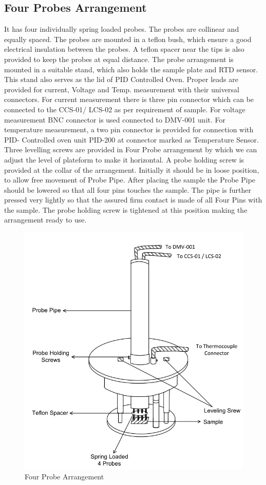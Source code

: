 \documentclass[%
 aip,
 amsmath,amssymb,
 reprint,%
]{revtex4-1}
\begin{document}
\subsection{Four Probes Arrangement}
It has four individually spring loaded probes. The probes are collinear and
equally spaced. The probes are mounted in a teflon bush, which ensure a good
electrical insulation between the probes. A teflon spacer near the tips is also provided
to keep the probes at equal distance. The probe arrangement is mounted in a suitable
stand, which also holds the sample plate and RTD sensor. This stand also serves as
the lid of PID Controlled Oven. Proper leads are provided for current, Voltage and
Temp. measurement with their universal connectors. For current measurement there is
three pin connector which can be connected to the CCS-01/ LCS-02 as per
requirement of sample. For voltage measurement BNC connector is used connected to
DMV-001 unit. For temperature measurement, a two pin connector is provided for
connection with PID- Controlled oven unit PID-200 at connector marked as
Temperature Sensor. Three levelling screws are provided in Four Probe arrangement by which we can adjust the
level of plateform to make it horizontal. A probe holding screw is provided at the collar of the
arrangement. Initially it should be in loose position, to allow free movement of Probe Pipe.
After placing the sample the Probe Pipe should be lowered so that all four pins touches the
sample. The pipe is further pressed very lightly so that the assured firm contact is made of all Four
Pins with the sample. The probe holding screw is tightened at this position making the arrangement ready to use.
\begin{figure}
    \centering
    \includegraphics[scale = 0.56]{Figures/four-probe-arrangement.png}
    \caption{Four Probe Arrangement}
    \label{fig:4-probe}
\end{figure}
\end{document}
